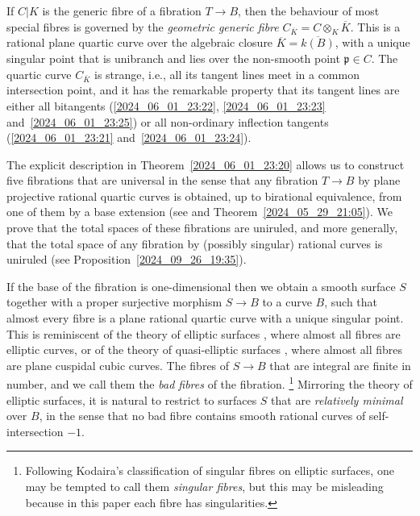 \documentclass[12pt,reqno]{amsart}
\theoremstyle{definition}
\newcommand{\ov}{\overline}
\newcommand{\pp}{\mathfrak{p}}
\begin{document}
If $C|K$ is the generic fibre of a fibration $T\to B$, then the behaviour of most special fibres is governed by the \emph{geometric generic fibre} $C_{\ov K} = C \otimes_K \ov K$.
This is a rational plane quartic curve over the algebraic closure $\ov K = \ov {k(B)}$, with a unique singular point that is unibranch and lies over the non-smooth point $\pp \in C$. The quartic curve $C_{\ov K}$ is strange, i.e., all its tangent lines meet in a common intersection point, and it has the remarkable property that its tangent lines  are either all bitangents (\ref{2024_06_01_23:22}, \ref{2024_06_01_23:23} and~\ref{2024_06_01_23:25}) or all non-ordinary inflection tangents (\ref{2024_06_01_23:21} and~\ref{2024_06_01_23:24}).

The explicit description in Theorem~\ref{2024_06_01_23:20} allows us to construct five fibrations that are universal in the sense that any fibration $T\to B$ by plane projective rational quartic curves is obtained, up to birational equivalence, from one of them by a base extension (see \cite[Theorems~5.1 and~5.2]{HiSt23} and Theorem~\ref{2024_05_29_21:05}). 
We prove that the total spaces of these fibrations are uniruled, and more generally, that the total space of any fibration by (possibly singular) rational curves is uniruled (see Proposition~\ref{2024_09_26_19:35}).

If the base of the fibration is one-dimensional then we obtain a smooth surface $S$ together with a proper surjective morphism $S\to B$ to a curve $B$, such that almost every fibre is a plane rational quartic curve with a unique singular point.
This is reminiscent of the theory of elliptic surfaces \cite{SchSh10}, where almost all fibres are elliptic curves, or of the theory of quasi-elliptic surfaces \cite{BM76,Lan79}, where almost all fibres are plane cuspidal cubic curves.
The fibres of $S\to B$ that are integral are finite in number, and we call them the \emph{bad fibres} of the fibration.
\footnote{Following Kodaira's classification of singular fibres on elliptic surfaces, one may be tempted to call them \emph{singular fibres}, but this may be misleading because in this paper each fibre has singularities.}
Mirroring the theory of elliptic surfaces, it is natural to restrict to surfaces $S$ that are \emph{relatively minimal} over $B$, in the sense that no bad fibre contains smooth rational curves of self-intersection $-1$.
\end{document}
